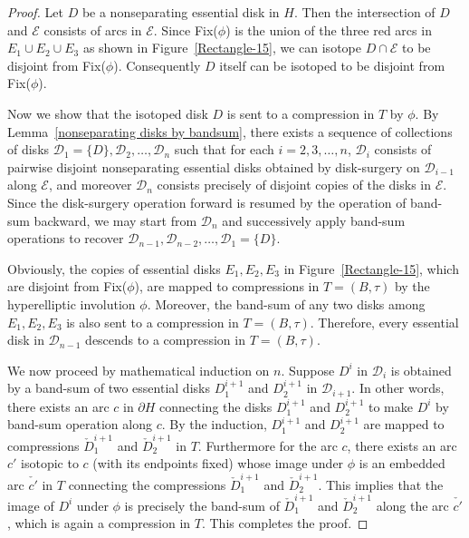 \documentclass[12pt]{amsart}
\begin{document}
\begin{proof}
Let $D$ be a nonseparating essential disk in $H$. Then the intersection of $D$ and $\mathcal{E}$ consists of arcs in $\mathcal{E}$.
Since Fix($\phi$) is the union of the three red arcs in $E_1\cup E_2\cup E_3$ as shown in Figure~\ref{Rectangle-15}, we can isotope $D\cap\mathcal{E}$ to be disjoint
from Fix($\phi$). Consequently $D$ itself can be isotoped to be disjoint from Fix($\phi$).

Now we show that the isotoped disk $D$ is sent to a compression in $T$ by $\phi$.
By Lemma~\ref{nonseparating disks by bandsum}, there exists a sequence of collections of disks $\mathcal{D}_1=\{D\}, \mathcal{D}_2, \ldots, \mathcal{D}_n$ such that for each $i=2, 3, \ldots, n$, $\mathcal{D}_i$ consists of pairwise disjoint nonseparating essential disks obtained by disk-surgery on $\mathcal{D}_{i-1}$
along $\mathcal{E}$, and moreover $\mathcal{D}_n$ consists precisely of disjoint copies of the disks in $\mathcal{E}$. Since the disk-surgery operation forward is resumed by the operation of band-sum backward, we may start from $\mathcal{D}_n$ and successively apply band-sum operations to recover $\mathcal{D}_{n-1}, \mathcal{D}_{n-2}, \ldots, \mathcal{D}_1=\{D\}$.

Obviously, the copies of essential disks $E_1, E_2, E_3$ in Figure~\ref{Rectangle-15}, which are disjoint from Fix($\phi$), are mapped to compressions in $T=(B, \tau)$ by the hyperelliptic involution $\phi$. Moreover, the band-sum of any two disks among $E_1, E_2, E_3$ is also sent to a compression in $T=(B, \tau)$. Therefore, every essential disk in $\mathcal{D}_{n-1}$ descends to a compression in $T=(B, \tau)$.


We now proceed by mathematical induction on $n$. Suppose $D^i$ in $\mathcal{D}_i$ is obtained by a band-sum of two essential disks $D^{i+1}_1$ and $D^{i+1}_2$ in $\mathcal{D}_{i+1}$. In other words, there exists an arc $c$ in $\partial H$ connecting the disks $D^{i+1}_1$ and $D^{i+1}_2$ to make $D^i$ by band-sum operation along $c$. By the induction, $D^{i+1}_1$ and $D^{i+1}_2$ are mapped to compressions $\check{D}^{i+1}_1$ and $\check{D}^{i+1}_2$ in $T$. Furthermore for the arc $c$, there exists an arc $c'$ isotopic to $c$ (with its endpoints fixed) whose image under $\phi$ is an embedded arc $\check{c'}$ in $T$ connecting the compressions $\check{D}^{i+1}_1$ and $\check{D}^{i+1}_2$. This implies that the image of $D^i$ under $\phi$ is precisely the band-sum of $\check{D}^{i+1}_1$ and $\check{D}^{i+1}_2$ along the arc $\check{c'}$, which is again a compression in $T$. This completes the proof.
\end{proof}
\end{document}
